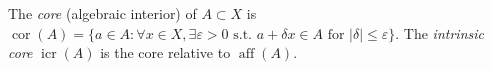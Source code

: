 The \emph{core} (algebraic interior) of $A \subset X$ is $\operatorname{cor}(A) = \{a \in A : \forall x \in X, \exists \varepsilon > 0 \text{ s.t. } a + \delta x \in A \text{ for } |\delta| \leqslant \varepsilon\}$. The \emph{intrinsic core} $\operatorname{icr}(A)$ is the core relative to $\operatorname{aff}(A)$.
